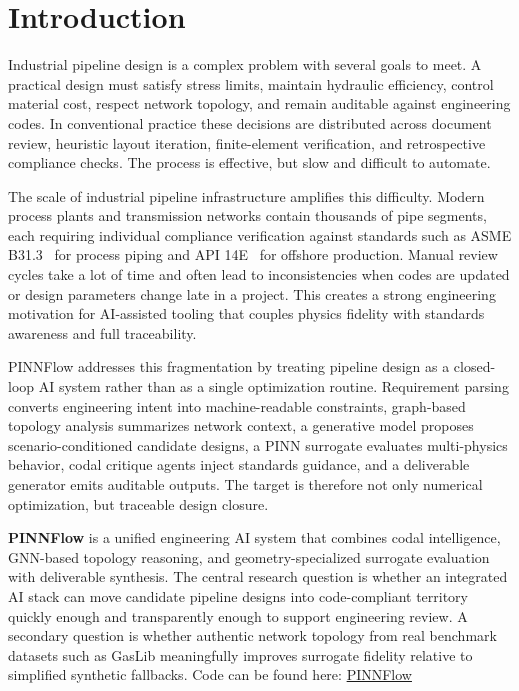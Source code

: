 \documentclass[conference]{IEEEtran}
\begin{document}
\section{Introduction}

Industrial pipeline design is a complex problem with several goals to meet. A practical design must satisfy stress limits, maintain hydraulic efficiency, control material cost, respect network topology, and remain auditable against engineering codes. In conventional practice these decisions are distributed across document review, heuristic layout iteration, finite-element verification, and retrospective compliance checks. The process is effective, but slow and difficult to automate.
 
The scale of industrial pipeline infrastructure amplifies this difficulty. Modern process plants and transmission networks contain thousands of pipe segments, each requiring individual compliance verification against standards such as ASME B31.3~\cite{ASME_B31_3} for process piping and API 14E~\cite{api2026} for offshore production. Manual review cycles take a lot of time and often lead to inconsistencies when codes are updated or design parameters change late in a project. This creates a strong engineering motivation for AI-assisted tooling that couples physics fidelity with standards awareness and full traceability.
 
PINNFlow addresses this fragmentation by treating pipeline design as a closed-loop AI system rather than as a single optimization routine. Requirement parsing converts engineering intent into machine-readable constraints, graph-based topology analysis summarizes network context, a generative model proposes scenario-conditioned candidate designs, a PINN surrogate evaluates multi-physics behavior, codal critique agents inject standards guidance, and a deliverable generator emits auditable outputs. The target is therefore not only numerical optimization, but traceable design closure.
 
\textbf{PINNFlow} is a unified engineering AI system that combines codal intelligence, GNN-based topology reasoning, and geometry-specialized surrogate evaluation with deliverable synthesis. The central research question is whether an integrated AI stack can move candidate pipeline designs into code-compliant territory quickly enough and transparently enough to support engineering review. A secondary question is whether authentic network topology from real benchmark datasets such as GasLib meaningfully improves surrogate fidelity relative to simplified synthetic fallbacks. Code can be found here: \href{https://github.com/kushal-bhargav/PINNFlow.git}{PINNFlow}
 
\end{document}
